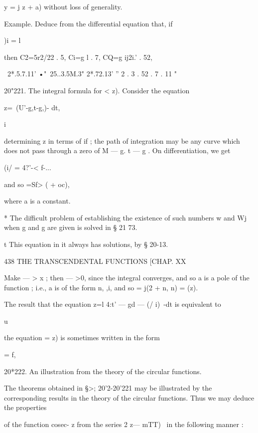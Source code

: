 {y =  j z + a) 
without loss of generality. 

Example. Deduce from the differential equation that, if 



)i = l 



then C2=5r2/22 . 5, Ci=g l  . 7, CQ=g ij2i.'  . 52, 

 ~2*.5.7.11' •"~25..3.5M.3" 2*.72.13' '' 2  . 3 . 52 . 7 . 11 " 

20"221. The integral formula for <   z). 
Consider the equation 

z=\ (U'-g,t-g,)- dt, 

  i 

determining z in terms of if ; the path of integration may be any curve which 
does not pass through a zero of M  — g. t — g . 
On differentiation, we get 



(i/ = 4?'-< f-... 



and so  =Sf> (  + oc), 

where a is a constant. 

* The difficult problem of establishing the existence of such numbers w  and Wj when g  and 
g  are given is solved in § 21 73. 

t This equation in it always has solutions, by § 20-13. 



438 THE TRANSCENDENTAL FUNCTIONS [CHAP. XX 

Make  — > x ; then  — >0, since the integral converges, and so a is a pole 
of the function  ; i.e., a is of the form n,  ,i, and so  = j(2 + n,  n) =  (z). 

The result that the equation z=l  4:t'  — gd — (/ i)~-dt is equivalent to 

u 

the equation  =  z) is sometimes written in the form 



= f, 



20*222. An illustration from the theory of the circular functions. 

The theorems obtained in §>; 20'2-20'221 may be illustrated by the corresponding 
results in the theory of the circular functions. Thus we may deduce the properties 

of the function cosec- z from the series 2  z— mTT)~  in the following manner : 

}
